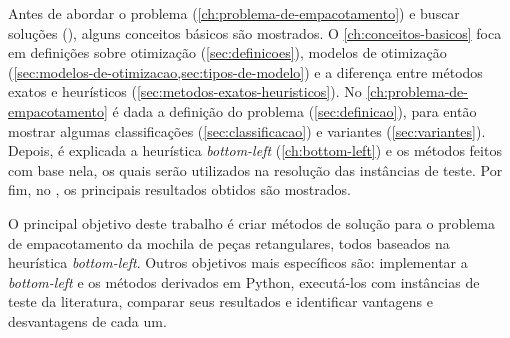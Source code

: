 Antes de abordar o problema (\autoref{ch:problema-de-empacotamento}) e buscar soluções
(), alguns conceitos básicos são mostrados.
O \autoref{ch:conceitos-basicos} foca em definições sobre otimização (\autoref{sec:definicoes}),
modelos de otimização (\cref{sec:modelos-de-otimizacao,sec:tipos-de-modelo}) e a diferença entre
métodos exatos e heurísticos (\cref{sec:metodos-exatos-heuristicos}).
No \autoref{ch:problema-de-empacotamento} é dada a definição do problema (\autoref{sec:definicao}),
para então mostrar algumas classificações (\autoref{sec:classificacao}) e variantes
(\autoref{sec:variantes}).
Depois, é explicada a heurística \textit{bottom-left} (\autoref{ch:bottom-left}) e os métodos feitos
com base nela, os quais serão utilizados na resolução das instâncias de teste.
Por fim, no , os principais resultados obtidos são mostrados.


O principal objetivo deste trabalho é criar métodos de solução para o problema de
empacotamento da mochila de peças retangulares, todos baseados na heurística \textit{bottom-left}.
Outros objetivos mais específicos são: implementar a \textit{bottom-left} e os métodos derivados em
Python, executá-los com instâncias de teste da literatura, comparar seus resultados e identificar
vantagens e desvantagens de cada um.
